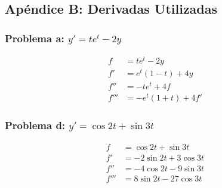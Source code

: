 \documentclass[12pt,a4paper]{article}
\begin{document}
\subsection{Apéndice B: Derivadas Utilizadas}

\subsubsection{Problema a: $y' = te^t - 2y$}

\begin{align}
f &= te^t - 2y \\
f' &= e^t(1-t) + 4y \\
f'' &= -te^t + 4f \\
f''' &= -e^t(1+t) + 4f'
\end{align}

\subsubsection{Problema d: $y' = \cos 2t + \sin 3t$}

\begin{align}
f &= \cos 2t + \sin 3t \\
f' &= -2\sin 2t + 3\cos 3t \\
f'' &= -4\cos 2t - 9\sin 3t \\
f''' &= 8\sin 2t - 27\cos 3t
\end{align}
\end{document}
